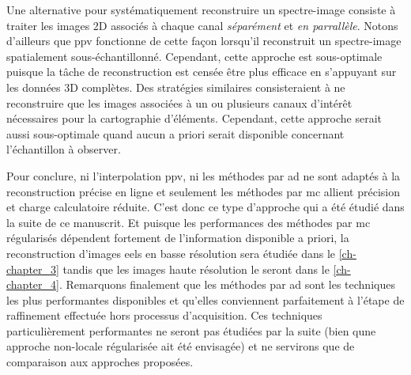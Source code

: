 Une alternative pour systématiquement reconstruire un spectre-image consiste à traiter les images 2D associés à chaque canal \emph{séparément} et \emph{en parrallèle}. Notons d'ailleurs que \gls{ppv} fonctionne de cette façon lorsqu'il reconstruit un spectre-image spatialement sous-échantillonné. Cependant, cette approche est sous-optimale puisque la tâche de reconstruction est censée être plus efficace en s'appuyant sur les données 3D complètes. Des stratégies similaires consisteraient à ne reconstruire que les images associées à un ou plusieurs canaux d'intérêt nécessaires pour la cartographie d'éléments. Cependant, cette approche serait aussi sous-optimale quand aucun a priori serait disponible concernant l'échantillon à observer.

Pour conclure, ni l'interpolation \gls{ppv}, ni les méthodes par \gls{ad} ne sont adaptés à la reconstruction précise en ligne et seulement les méthodes par \gls{mc} allient précision et charge calculatoire réduite. C'est donc ce type d'approche qui a été étudié dans la suite de ce manuscrit. Et puisque les performances des méthodes par \gls{mc} régularisés dépendent fortement de l'information disponible a priori, la reconstruction d'images \gls{eels} en basse résolution sera étudiée dans le \cref{ch-chapter_3} tandis que les images haute résolution le seront dans le \cref{ch-chapter_4}. Remarquons finalement que les méthodes par \gls{ad} sont les techniques les plus performantes disponibles et qu'elles conviennent parfaitement à l'étape de raffinement effectuée hors processus d'acquisition. Ces techniques particulièrement performantes ne seront pas étudiées par la suite (bien qune approche non-locale régularisée ait été envisagée) et ne servirons que de comparaison aux approches proposées.



